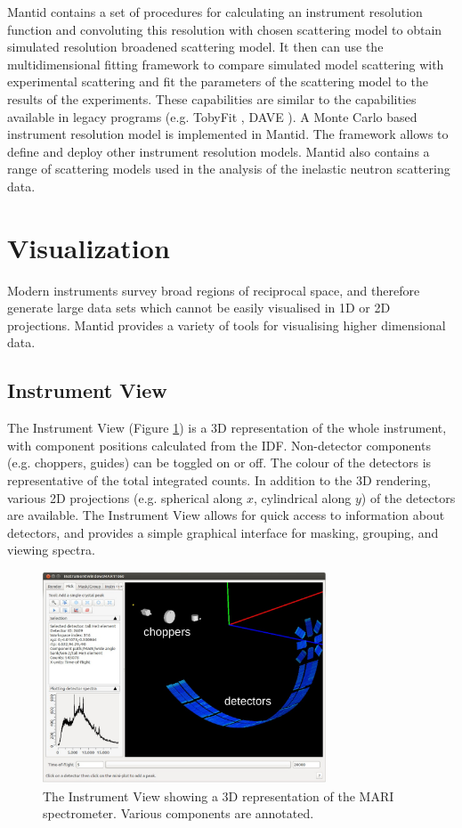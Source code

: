 \documentclass[1p]{elsarticle}
\begin{document}
Mantid contains a set of procedures for calculating an instrument resolution function and convoluting this resolution with chosen scattering model to obtain simulated resolution broadened scattering model. It then can use the multidimensional fitting framework to compare simulated model scattering with experimental scattering and fit the parameters of the scattering model to the results of the experiments. These capabilities are similar to the capabilities available in legacy programs (e.g. TobyFit \cite{tobyfit}, DAVE \cite{DAVE}). A Monte Carlo based instrument resolution model is implemented in Mantid. The framework allows to define and deploy other instrument resolution models. Mantid also contains a range of scattering models used in the analysis of the inelastic neutron scattering data.
 

\section{Visualization}

Modern instruments survey broad regions of reciprocal space, and therefore generate large data sets which cannot be easily visualised in 1D or 2D projections. 
Mantid provides a variety of tools for visualising higher dimensional data. 


\subsection{Instrument View}
The Instrument View (Figure \ref{fig:InstrumentView}) is a 3D representation of the whole instrument, with component  positions  calculated from the IDF. Non-detector components (e.g. choppers, guides) can be toggled on or off. 
The colour of the detectors is representative of the total integrated counts. In addition to the 3D rendering, various 2D projections (e.g. spherical along $x$, cylindrical along $y$) of the detectors are available.
The  Instrument View allows for quick access to information about detectors, and provides a simple graphical interface for masking, grouping, and viewing spectra.


\begin{figure}[!htb]
\centerline{\includegraphics[width=0.75\textwidth]{InstrumentView.pdf}}
\caption{The Instrument View showing a 3D representation of the MARI spectrometer. Various components are annotated.  }
\label{fig:InstrumentView}
\end{figure}
\end{document}
